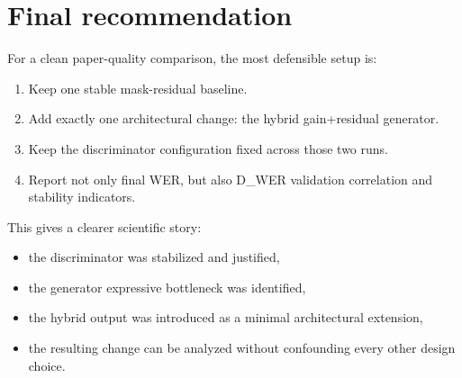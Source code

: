 \documentclass[11pt]{article}
\begin{document}
\section{Final recommendation}
For a clean paper-quality comparison, the most defensible setup is:
\begin{enumerate}[leftmargin=*]
    \item Keep one stable mask-residual baseline.
    \item Add exactly one architectural change: the hybrid gain+residual generator.
    \item Keep the discriminator configuration fixed across those two runs.
    \item Report not only final WER, but also D\_WER validation correlation and stability indicators.
\end{enumerate}

This gives a clearer scientific story:
\begin{itemize}[leftmargin=*]
    \item the discriminator was stabilized and justified,
    \item the generator expressive bottleneck was identified,
    \item the hybrid output was introduced as a minimal architectural extension,
    \item the resulting change can be analyzed without confounding every other design choice.
\end{itemize}
\end{document}
